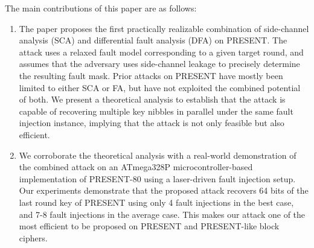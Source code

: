 \documentclass[10pt, conference, compsocconf]{IEEEtran}  %
\numberwithin{Definition}{section}
\numberwithin{Claim}{section}
\begin{document}

The main contributions of this paper are as follows:

\begin{enumerate}
\item The paper proposes the first practically realizable combination of side-channel analysis (SCA) and differential fault analysis (DFA) on PRESENT. The attack uses a relaxed fault model corresponding to a given target round, and assumes that the adversary uses side-channel leakage to precisely determine the resulting fault mask. Prior attacks on PRESENT have mostly been limited to either SCA or FA, but have not exploited the combined potential of both. We present a theoretical analysis to establish that the attack is capable of recovering multiple key nibbles in parallel under the same fault injection instance, implying that the attack is not only feasible but also efficient.

\item We corroborate the theoretical analysis with a real-world demonstration of the combined attack on an ATmega328P microcontroller-based implementation of PRESENT-80 using a laser-driven fault injection setup. Our experiments demonstrate that the proposed attack recovers 64 bits of the last round key of PRESENT using only 4 fault injections in the best case, and 7-8 fault injections in the average case. This makes our attack one of the most efficient to be proposed on PRESENT and PRESENT-like block ciphers.

\end{enumerate}
\end{document}
